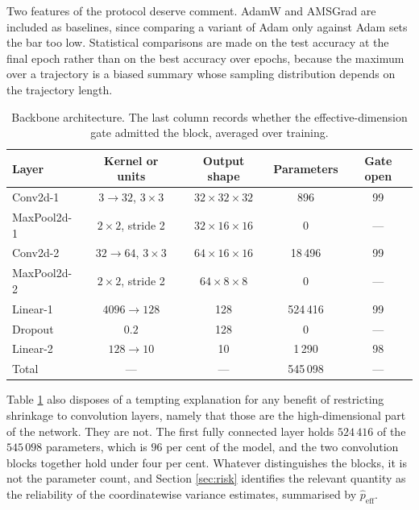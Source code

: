 \documentclass[pdflatex,sn-mathphys-num]{sn-jnl}%
\theoremstyle{thmstyleone}%
\theoremstyle{thmstyletwo}%
\theoremstyle{thmstylethree}%
\newcommand{\peff}{p_{\mathrm{eff}}}
\begin{document}
Two features of the protocol deserve comment. AdamW \cite{loshchilov2019} and AMSGrad \cite{reddi2018} are included as baselines, since comparing a variant of Adam only against Adam sets the bar too low. Statistical comparisons are made on the test accuracy at the final epoch rather than on the best accuracy over epochs, because the maximum over a trajectory is a biased summary whose sampling distribution depends on the trajectory length.

\begin{table}[t]
\centering
\caption{Backbone architecture. The last column records whether the effective-dimension gate admitted the block, averaged over training.}
\label{tab:arch}
\begin{tabular}{lcccc}
\toprule
Layer & Kernel or units & Output shape & Parameters & Gate open \\
\midrule
Conv2d-1     & $3\to32$, $3\times3$   & $32\times32\times32$ & 896     & 99 \\
MaxPool2d-1  & $2\times2$, stride 2   & $32\times16\times16$ & 0       & --- \\
Conv2d-2     & $32\to64$, $3\times3$  & $64\times16\times16$ & 18\,496 & 99 \\
MaxPool2d-2  & $2\times2$, stride 2   & $64\times8\times8$   & 0       & --- \\
\midrule
Linear-1     & $4096\to128$           & 128                  & 524\,416 & 99 \\
Dropout      & $0.2$                  & 128                  & 0        & --- \\
Linear-2     & $128\to10$             & 10                   & 1\,290   & 98 \\
\midrule
Total        & ---                    & ---                  & 545\,098 & --- \\
\bottomrule
\end{tabular}
\end{table}

Table \ref{tab:arch} also disposes of a tempting explanation for any benefit of restricting shrinkage to convolution layers, namely that those are the high-dimensional part of the network. They are not. The first fully connected layer holds $524\,416$ of the $545\,098$ parameters, which is $96$ per cent of the model, and the two convolution blocks together hold under four per cent. Whatever distinguishes the blocks, it is not the parameter count, and Section \ref{sec:risk} identifies the relevant quantity as the reliability of the coordinatewise variance estimates, summarised by $\hat\peff$.
\end{document}

